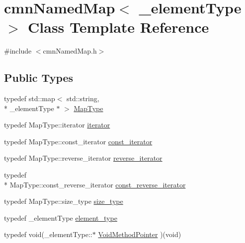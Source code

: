 \hypertarget{classcmn_named_map}{\section{cmn\-Named\-Map$<$ \-\_\-element\-Type $>$ Class Template Reference}
\label{classcmn_named_map}
}


{\ttfamily \#include $<$cmn\-Named\-Map.\-h$>$}

\subsection*{Public Types}
\begin{DoxyCompactItemize}
\item 
typedef std\-::map$<$ std\-::string, \\*
\-\_\-element\-Type $\ast$ $>$ \hyperlink{classcmn_named_map_a35919ad9cccf3e060063b489db663425}{Map\-Type}
\item 
typedef Map\-Type\-::iterator \hyperlink{classcmn_named_map_a0ad463b349c3c95e8f639e12f492765e}{iterator}
\item 
typedef Map\-Type\-::const\-\_\-iterator \hyperlink{classcmn_named_map_a94a2be09d6678944e3a330c641d69d41}{const\-\_\-iterator}
\item 
typedef Map\-Type\-::reverse\-\_\-iterator \hyperlink{classcmn_named_map_abfbc3bd1bf3e0ea32fcdf61db4377014}{reverse\-\_\-iterator}
\item 
typedef \\*
Map\-Type\-::const\-\_\-reverse\-\_\-iterator \hyperlink{classcmn_named_map_ad32ba46e0f30a14d943acac6b229094c}{const\-\_\-reverse\-\_\-iterator}
\item 
typedef Map\-Type\-::size\-\_\-type \hyperlink{classcmn_named_map_aaaf5963f1e9b26efb08e7f0cd7199335}{size\-\_\-type}
\item 
typedef \-\_\-element\-Type \hyperlink{classcmn_named_map_a04797ca34105e40893cf1bdbea391f32}{element\-\_\-type}
\item 
typedef void(\-\_\-element\-Type\-::$\ast$ \hyperlink{classcmn_named_map_a00103a8e6e3c75f6eeabcc3a0657521c}{Void\-Method\-Pointer} )(void)
\end{DoxyCompactItemize}
